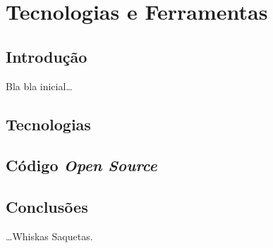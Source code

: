 \chapter{Tecnologias e Ferramentas}
\label{ch::tecno}

\section{Introdução}
\label{sec::tecno:intro}

Bla bla inicial\ldots


\section{Tecnologias}
\label{sec::tecno:tecno}



\section{Código \emph{Open Source}}
\label{sec::tecno:opensource}



\section{Conclusões}
\label{sec::tecno:conc}

\ldots Whiskas Saquetas.
